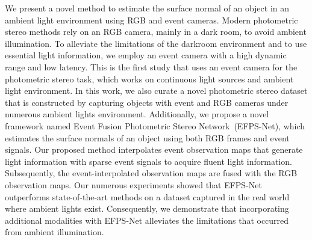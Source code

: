
We present a novel method to estimate the surface normal of an object in an ambient light environment using RGB and event cameras.
Modern photometric stereo methods rely on an RGB camera, mainly in a dark room, to avoid ambient illumination.
To alleviate the limitations of the darkroom environment and to use essential light information, we employ an event camera with a high dynamic range and low latency. 
This is the first study that uses an event camera for the photometric stereo task, which works on continuous light sources and ambient light environment. 
In this work, we also curate a novel photometric stereo dataset that is constructed by capturing objects with event and RGB cameras under numerous ambient lights environment.
Additionally, we propose a novel framework named Event Fusion Photometric Stereo Network~(EFPS-Net), which estimates the surface normals of an object using both RGB frames and event signals.
Our proposed method interpolates event observation maps that generate light information with sparse event signals to acquire fluent light information.
Subsequently, the event-interpolated observation maps are fused with the RGB observation maps. 
Our numerous experiments showed that EFPS-Net outperforms state-of-the-art methods on a dataset captured in the real world where ambient lights exist.
Consequently, we demonstrate that incorporating additional modalities with EFPS-Net alleviates the limitations that occurred from ambient illumination.

